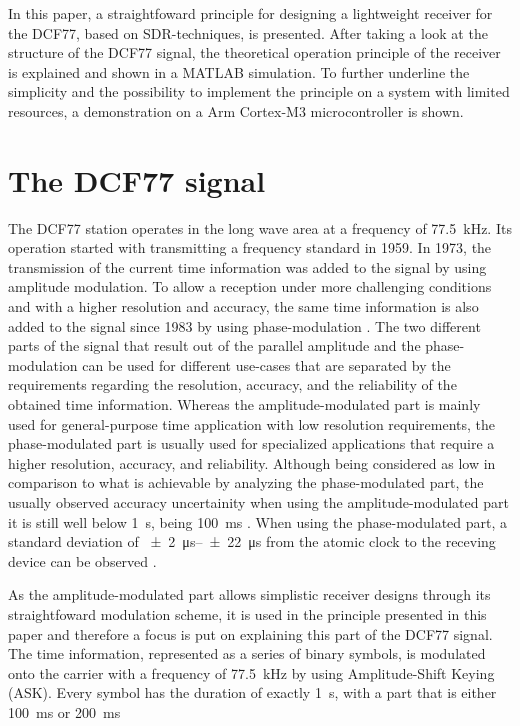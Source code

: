 \documentclass[conference]{IEEEtran}
\begin{document}
In this paper, a straightfoward principle for designing a lightweight receiver for the DCF77, based on SDR-techniques, is presented.
After taking a look at the structure of the DCF77 signal, the theoretical operation principle of the receiver is explained and shown in a MATLAB simulation.
To further underline the simplicity and the possibility to implement the principle on a system with limited resources, a demonstration on a Arm Cortex-M3 microcontroller
is shown.

\section{The DCF77 signal}
The DCF77 station operates in the long wave area at a frequency of \SI{77.5}{\kilo\hertz}.
Its operation started with transmitting a frequency standard in 1959.
In 1973, the transmission of the current time information was added to the signal by using amplitude modulation.
To allow a reception under more challenging conditions and with a higher resolution and accuracy, the same time information is also added to the signal since 1983 by using phase-modulation \cite{b3}.
The two different parts of the signal that result out of the parallel amplitude and the phase-modulation can be used for different use-cases that are separated by the
requirements regarding the resolution, accuracy, and the reliability of the obtained time information. 
Whereas the amplitude-modulated part is mainly used for general-purpose time application with low resolution requirements, the phase-modulated part is usually used
for specialized applications that require a higher resolution, accuracy, and reliability.
Although being considered as low in comparison to what is achievable by analyzing the phase-modulated part, the usually observed accuracy uncertainity when using the
amplitude-modulated part it is still well below \SI{1}{\second}, being \SI{100}{\milli\second} \cite{b2}.
When using the phase-modulated part, a standard deviation of \SIrange{\pm 2}{\pm 22}{\micro\second} from the atomic clock to the receving device can be observed \cite{b4}.
\par
As the amplitude-modulated part allows simplistic receiver designs through its straightfoward modulation scheme, it is used in the principle presented in this paper
and therefore a focus is put on explaining this part of the DCF77 signal.
The time information, represented as a series of binary symbols, is modulated onto the carrier with a frequency of \SI{77.5}{\kilo\hertz} by using
Amplitude-Shift Keying (ASK). Every symbol has the duration of exactly \SI{1}{\second}, with a part that is either \SI{100}{\milli\second} or \SI{200}{\milli\second}
\end{document}
